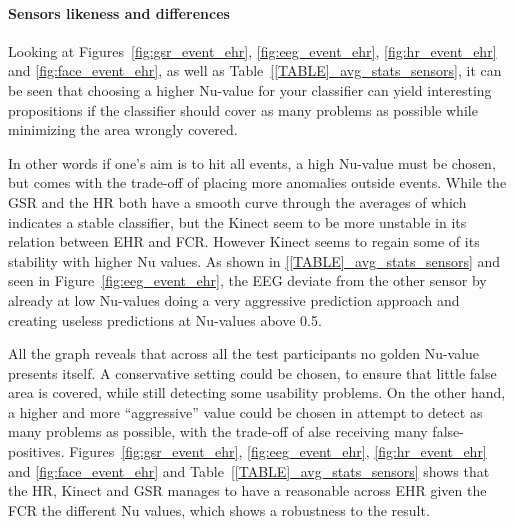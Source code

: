 \paragraph{Sensors likeness and differences}
Looking at Figures~\ref{fig:gsr_event_ehr}, \ref{fig:eeg_event_ehr}, \ref{fig:hr_event_ehr} and \ref{fig:face_event_ehr},
as well as Table~\ref{[TABLE]_avg_stats_sensors}, it can be seen that choosing a higher Nu-value for your classifier can yield interesting propositions if the classifier should cover as many problems as possible while minimizing the area wrongly covered.

In other words if one's aim is to hit all events, a high Nu-value must be chosen, but comes with the trade-off of placing more anomalies outside events. 
While the GSR and the HR both have a smooth curve through the averages of which indicates a stable classifier, but the Kinect seem to be more unstable in its relation between EHR and FCR. However Kinect seems to regain some of its stability with higher Nu values. As shown in \ref{[TABLE]_avg_stats_sensors} and seen in Figure~\ref{fig:eeg_event_ehr}, the EEG deviate from the other sensor by already at low Nu-values doing a very aggressive prediction approach and creating useless predictions at Nu-values above 0.5.

All the graph reveals that across all the test participants no golden Nu-value presents itself. A conservative
setting could be chosen, to ensure that little false area is covered, while still detecting some usability problems. On
the other hand, a higher and more ``aggressive'' value could be chosen in attempt to detect as many problems as
possible, with the trade-off of alse receiving many false-positives. Figures~\ref{fig:gsr_event_ehr},
\ref{fig:eeg_event_ehr}, \ref{fig:hr_event_ehr} and \ref{fig:face_event_ehr} and Table~\ref{[TABLE]_avg_stats_sensors}
shows that the HR, Kinect and GSR manages to have a reasonable across EHR given the FCR the different Nu values, which shows a robustness to the result.

